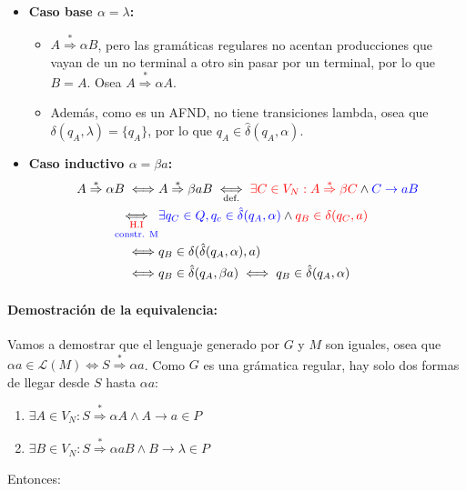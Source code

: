 \begin{itemize}
  \item \textbf{Caso base \(\alpha = \lambda\):}
        \begin{itemize}
          \item \(A\overset{*}{\Rightarrow} \alpha B\), pero las gramáticas regulares no acentan producciones que vayan de un no terminal a otro sin pasar por un terminal, por lo que \(B = A\). Osea \(A\overset{*}{\Rightarrow} \alpha A\).
          \item Además, como es un AFND, no tiene transiciones lambda, osea que \(\delta(q_A, \lambda) = \{q_A\}\), por lo que \(q_A\in\hat\delta(q_A, \alpha)\).
        \end{itemize}
  \item \textbf{Caso inductivo \(\alpha = \beta a\):}
        \begin{align*}
          A\overset{*}{\Rightarrow} \alpha B   \iff & A\overset{*}{\Rightarrow} \beta aB \iffa{def.} \red{\exists C\in V_N: A \overset{*}{\Rightarrow} \beta C} \wedge \blue{C\rightarrow aB} \\
          \iffab{\red{H.I}}{\blue{constr. M}}       & \blue{\exists q_C\in Q, q_c\in\hat\delta(q_A,\alpha)} \land \red{q_B\in\delta(q_C,a)}                                                   \\
          \iff                                      & q_B\in \delta(\hat\delta(q_A,\alpha),a)                                                                                                 \\
          \iff                                      & q_B\in\hat\delta(q_A, \beta a) \iff q_B\in\hat\delta(q_A, \alpha)                                                                       \\
        \end{align*}
\end{itemize}

\paragraph{Demostración de la equivalencia:} Vamos a demostrar que el lenguaje generado por \(G\) y \(M\) son iguales, osea que \(\alpha a\in\mathcal{L}(M)\iff S\overset{*}{\Rightarrow} \alpha a\).
Como \(G\) es una grámatica regular, hay solo dos formas de llegar desde \(S\) hasta \(\alpha a\):
\begin{enumerate}
  \item \(\exists A\in V_N: S \overset{*}{\Rightarrow} \alpha A \wedge A \rightarrow a \in P\)
  \item \(\exists B\in V_N: S \overset{*}{\Rightarrow} \alpha aB \wedge B \rightarrow \lambda \in P\)
\end{enumerate}
Entonces:

